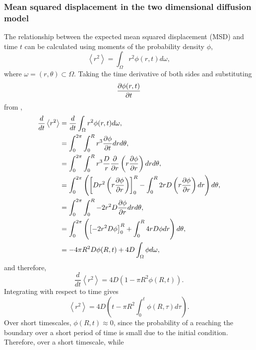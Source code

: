 \subsubsection{Mean squared displacement in the two dimensional diffusion model} \label{msd2d}
%
The relationship between the expected mean squared displacement (MSD) and time $t$
can be calculated using moments of the probability density $\phi$,
%
\begin{equation}
\left<r^2\right> = \int_{\Omega}r^2 \phi(r,t) d\omega ,
\label{eqn:MSD_expectation}
\end{equation}
%
where $\omega = (r,\theta) \subset \Omega$. Taking the time derivative of both
sides and substituting
\begin{equation}
    \frac{\partial \phi(r,t)}{\partial t}
\end{equation} from ,
%
\begin{align}
\frac{d}{dt} \left<r^2\right> &= \frac{d}{dt}\int_{\Omega}r^2 \phi(r,t) d\omega , \nonumber\\
                           &= \int_0^{2\pi} \int_0^{R} r^3 \frac{\partial \phi}{\partial t} dr d\theta ,\nonumber\\
                            &= \int_0^{2\pi} \int_0^{R} r^3 \frac{D}{r} \frac{\partial }{\partial r } \left( r \frac{\partial  \phi}{\partial  r}\right) dr d\theta , \nonumber\\
                            &= \int_0^{2\pi} \left( \left[ D r^2 \left( r \frac{\partial  \phi}{\partial  r}\right) \right]_0^{R} - \int_0^{R} 2rD \left(r \frac{\partial \phi}{\partial r} \right) dr \right) d\theta , \nonumber\\
                            &= \int_0^{2\pi} \int_0^{R} -2r^2D \frac{\partial  \phi}{\partial r}dr d\theta , \nonumber\\
                            &= \int_0^{2\pi} \left( \left[-2r^2D \phi \right]_0^{R} + \int_0^{R} 4rD \phi dr \right)d\theta , \nonumber\\
                            &= - 4\pi R^2D \phi(R,t) + 4D \int_{\Omega} \phi d\omega ,
\label{eqn:diffusion_1}
\end{align}
%
and therefore,
\begin{equation}
\frac{d}{dt} \left<r^2\right>  = 4D( 1- \pi R^2 \phi(R,t)) .
\end{equation}
%
Integrating with respect to time gives
%
\begin{equation}
\left<r^2\right> = 4D \left( t - \pi R^2 \int_0^t \phi(R,\tau) d \tau \right).
\label{eqn:diffusion_msd}
\end{equation}
%
Over short timescales, $\phi(R,t) \approx 0$, since the probability of a reaching the boundary over a short period of time is small due to the initial condition. Therefore, over a short timescale, while
